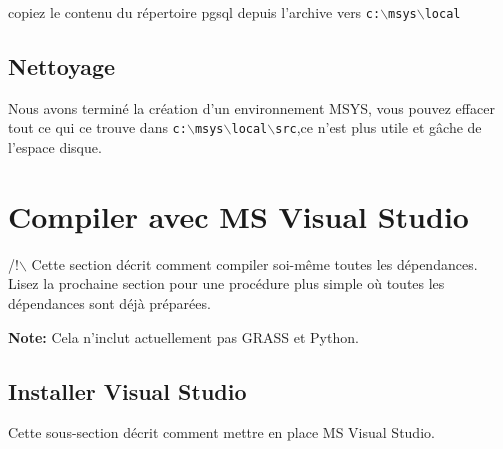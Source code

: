 copiez le contenu du r\'epertoire pgsql depuis l'archive vers \texttt{c:$\backslash$msys$\backslash$local}


\subsection{Nettoyage}
Nous avons termin\'e la cr\'eation d'un environnement MSYS, vous pouvez effacer tout ce qui ce trouve dans \texttt{c:$\backslash$msys$\backslash$local$\backslash$src},ce n'est plus utile et g\^ache de l'espace disque.

% 

\section{Compiler avec MS Visual Studio}
/!$\backslash$ Cette section d\'ecrit comment compiler soi-m\^eme toutes les d\'ependances. Lisez la prochaine section pour une proc\'edure plus simple o\`u toutes les d\'ependances sont d\'ej\`a pr\'epar\'ees.

\textbf{Note:} Cela n'inclut actuellement pas GRASS et Python.


\subsection{Installer Visual Studio}
Cette sous-section d\'ecrit comment mettre en place MS Visual Studio. 

